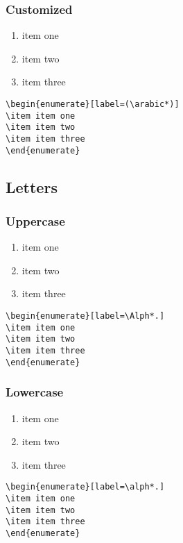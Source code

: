 \documentclass[12pt, letterpaper]{article}
\begin{document}
\subsubsection{Customized}
\begin{enumerate}[label=(\arabic*)]
		\item item one 
		\item item two
		\item item three
\end{enumerate}
\begin{lstlisting}
\begin{enumerate}[label=(\arabic*)]
\item item one 
\item item two
\item item three
\end{enumerate}
\end{lstlisting}


\subsection{Letters}

\subsubsection{Uppercase}
\begin{enumerate}[label=\Alph*.]
	\item item one 
	\item item two
	\item item three
\end{enumerate}
\begin{lstlisting}
\begin{enumerate}[label=\Alph*.]
\item item one 
\item item two
\item item three
\end{enumerate}
\end{lstlisting}

\subsubsection{Lowercase}
\begin{enumerate}[label=\alph*.]
	\item item one 
	\item item two
	\item item three
\end{enumerate}
\begin{lstlisting}
\begin{enumerate}[label=\alph*.]
\item item one 
\item item two
\item item three
\end{enumerate}
\end{lstlisting}
\end{document}
